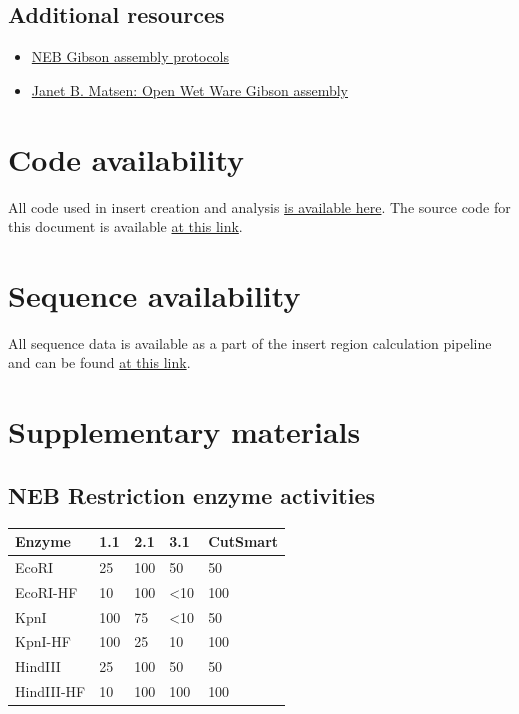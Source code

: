 \documentclass[11pt]{article}
\begin{document}
\subsection{Additional resources}

\begin{itemize}
	\item \href{https://www.neb.com/applications/cloning-and-synthetic-biology/dna-assembly-and-cloning/gibson-assembly}{NEB Gibson assembly protocols}
	\item \href{https://openwetware.org/wiki/Janet_B._Matsen:Guide_to_Gibson_Assembly}{Janet B. Matsen: Open Wet Ware Gibson assembly}
\end{itemize}


\section{Code availability}

All code used in insert creation and analysis \href{https://github.com/EthanHolleman/plasmid-VR-design}{is available here}. The source code for this document is available \href{https://github.com/EthanHolleman/VR-cloning-protocol}{at this link}.

\section{Sequence availability}

All sequence data is available as a part of the insert region calculation pipeline and can be found \href{https://github.com/EthanHolleman/plasmid-VR-design/releases/tag/v1.0}{at this link}. 

\section{Supplementary materials}

\subsection{NEB Restriction enzyme activities}

\begin{table}[H]
	\centering
	\begin{tabular}{@{}lllll@{}}
		\toprule
		Enzyme     & 1.1 & 2.1 & 3.1           & CutSmart \\ \midrule
		EcoRI      & 25  & 100 & 50            & 50       \\
		EcoRI-HF   & 10  & 100 & \textless{}10 & 100      \\
		KpnI       & 100 & 75  & \textless{}10 & 50       \\
		KpnI-HF    & 100 & 25  & 10            & 100      \\
		HindIII    & 25  & 100 & 50            & 50       \\
		HindIII-HF & 10  & 100 & 100           & 100      \\ \bottomrule
	\end{tabular}
\end{table}
\end{document}
